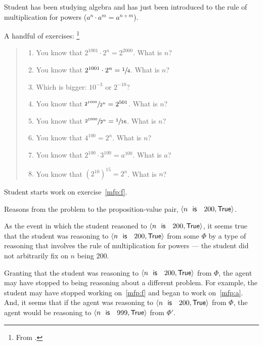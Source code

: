 \begin{note}
  \begin{illustration}[Textbook]
    \label{illu:tR:powers}
    Student has been studying algebra and has just been introduced to the rule of multiplication for powers (\(a^{n} \cdot a^{m} = a^{n + m}\)).

    A handful of exercises:%
    \footnote{
      From \textcite[31]{Gelfand:1993aa}.
    }

    \begin{quote}
      \begin{enumerate}[label=(\alph*), ref=(\alph*)]
      \item
        \label{mfp:a}
        You know that \(2^{1001} \cdot 2^{n} = 2^{2000}\).
        What is \(n\)?
      \item
        \label{mfp:b}
        You know that \(2^{1001} \cdot 2^{n} = \sfrac{1}{4}\).
        What is \(n\)?
      \item
        \label{mfp:c}
        Which is bigger: \(10^{-3}\) or \(2^{-10}\)?
      \item
        \label{mfp:d}
        You know that \(\sfrac{2^{1000}}{2^{n}} = 2^{501}\).
        What is \(n\)?
      \item
        \label{mfp:e}
        You know that \(\sfrac{2^{1000}}{2^{n}} = \sfrac{1}{16}\).
        What is \(n\)?
      \item
        \label{mfp:f}
        You know that \(4^{100} = 2^{n}\).
        What is \(n\)?
      \item
        \label{mfp:g}
        You know that \(2^{100} \cdot 3^{100} = a^{100}\).
        What is \(a\)?
      \item
        \label{mfp:h}
        You know that \((2^{10})^{15} = 2^{n}\).
        What is \(n\)?
      \end{enumerate}
    \end{quote}

    Student starts work on exercise~\ref{mfp:f}.

    Reasons from the problem to the proposition-value pair, \(\pv{n\prop{ is }200}{\val{True}}\).

    As the event in which the student reasoned to \(\pv{n\prop{ is }200}{\val{True}}\), it seems true that the student was reasoning to \(\pv{n\prop{ is }200}{\val{True}}\) from some \pool{} \(\Phi\) by a type of reasoning that involves the rule of multiplication for powers --- the student did not arbitrarily fix on \(n\) being \(200\).

    Granting that the student was reasoning to \(\pv{n\prop{ is }200}{\val{True}}\) from \(\Phi\), the agent may have stopped to being reasoning about a different problem.
    For example, the student may have stopped working on~\ref{mfp:f} and began to work on~\ref{mfp:a}.
    And, it seems that if the agent was reasoning to \(\pv{n\prop{ is }200}{\val{True}}\) from \(\Phi\), the agent would be reasoning to \(\pv{n\prop{ is }999}{\val{True}}\) from \(\Phi'\).


\end{illustration}
\end{note}
